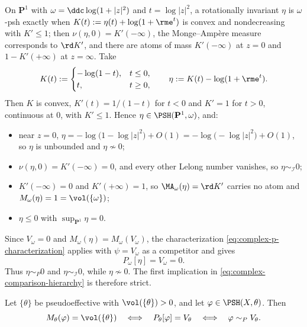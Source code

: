 \begin{remark}
\label{rem:ch51-loglog-explicit}
On \(\mathbf P^1\) with \(\omega=\ddc\log(1+|z|^2)\) and
\(t=\log|z|^2\), a rotationally invariant \(\eta\) is \(\omega\)-psh
exactly when \(K(t):=\eta(t)+\log(1+\rme^t)\) is convex and
nondecreasing with \(K'\leq1\); then \(\nu(\eta,0)=K'(-\infty)\), the
Monge--Amp\`ere measure corresponds to \(\rd K'\), and there are atoms of
mass \(K'(-\infty)\) at \(z=0\) and \(1-K'(+\infty)\) at \(z=\infty\).
Take
\[
 K(t):=
 \begin{cases}
 -\log(1-t), & t\leq0,\\
 t, & t\geq0 ,
 \end{cases}
 \qquad
 \eta:=K(t)-\log(1+\rme^t).
\]
Then \(K\) is convex, \(K'(t)=1/(1-t)\) for \(t<0\) and \(K'=1\) for
\(t>0\), continuous at \(0\), with \(K'\leq1\).  Hence
\(\eta\in\PSH(\mathbf P^1,\omega)\), and:
\begin{itemize}
\item near \(z=0\), \(\eta=-\log\bigl(1-\log|z|^2\bigr)+O(1)
      =-\log\bigl(-\log|z|^2\bigr)+O(1)\), so \(\eta\) is unbounded and
      \(\eta\not\sim0\);
\item \(\nu(\eta,0)=K'(-\infty)=0\), and every other Lelong number
      vanishes, so \(\eta\sim_{\mathcal I}0\);
\item \(K'(-\infty)=0\) and \(K'(+\infty)=1\), so
      \(\MA_\omega(\eta)=\rd K'\) carries no atom and
      \(M_\omega(\eta)=1=\vol(\{\omega\})\);
\item \(\eta\leq0\) with \(\sup_{\mathbf P^1}\eta=0\).
\end{itemize}
Since \(V_\omega=0\) and \(M_\omega(\eta)=M_\omega(V_\omega)\), the
characterization \eqref{eq:complex-p-characterization} applies with
\(\psi=V_\omega\) as a competitor and gives
\[
 P_\omega[\eta]=V_\omega=0 .
\]
Thus \(\eta\sim_P0\) and \(\eta\sim_{\mathcal I}0\), while
\(\eta\not\sim0\).  The first implication in
\eqref{eq:complex-comparison-hierarchy} is therefore strict.
\end{remark}

\begin{corollary}
\label{cor:ch51-full-mass-envelope}
Let \(\{\theta\}\) be pseudoeffective with \(\vol(\{\theta\})>0\), and let
\(\varphi\in\PSH(X,\theta)\).  Then
\[
 M_\theta(\varphi)=\vol(\{\theta\})
 \quad\Longleftrightarrow\quad
 P_\theta[\varphi]=V_\theta
 \quad\Longleftrightarrow\quad
 \varphi\sim_PV_\theta .
\]
\end{corollary}

